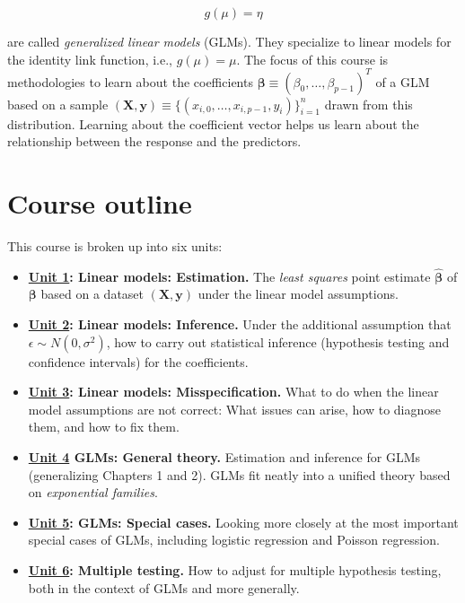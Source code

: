 \documentclass[
  11pt,
  letterpaper,
  oneside]{book}
\providecommand{\tightlist}{%
  \setlength{\itemsep}{0pt}\setlength{\parskip}{0pt}}\usepackage{longtable,booktabs,array}
\theoremstyle{definition}
\theoremstyle{plain}
\theoremstyle{plain}
\theoremstyle{plain}
\theoremstyle{remark}
\begin{document}
\[
g(\mu) = \eta
\]

are called \emph{generalized linear models} (GLMs). They specialize to
linear models for the identity link function, i.e., \(g(\mu) = \mu\).
The focus of this course is methodologies to learn about the
coefficients
\(\boldsymbol{\beta} \equiv (\beta_0, \dots, \beta_{p-1})^T\) of a GLM
based on a sample
\((\boldsymbol{X}, \boldsymbol{y}) \equiv \{(x_{i,0}, \dots, x_{i,p-1}, y_i)\}_{i = 1}^n\)
drawn from this distribution. Learning about the coefficient vector
helps us learn about the relationship between the response and the
predictors.

\hypertarget{course-outline}{%
\section{Course outline}\label{course-outline}}

This course is broken up into six units:

\begin{itemize}
\tightlist
\item
  \textbf{\protect\hyperlink{sec-linear-models-estimation}{Unit 1}:
  Linear models: Estimation.} The \emph{least squares} point estimate
  \(\boldsymbol{\widehat \beta}\) of \(\boldsymbol{\beta}\) based on a
  dataset \((\boldsymbol{X}, \boldsymbol{y})\) under the linear model
  assumptions.
\item
  \textbf{\protect\hyperlink{linear-models-inference}{Unit 2}: Linear
  models: Inference.} Under the additional assumption that
  \(\epsilon \sim N(0,\sigma^2)\), how to carry out statistical
  inference (hypothesis testing and confidence intervals) for the
  coefficients.
\item
  \textbf{\protect\hyperlink{linear-models-misspecification}{Unit 3}:
  Linear models: Misspecification.} What to do when the linear model
  assumptions are not correct: What issues can arise, how to diagnose
  them, and how to fix them.
\item
  \textbf{\protect\hyperlink{ch-glm-theory}{Unit 4} GLMs: General
  theory.} Estimation and inference for GLMs (generalizing Chapters 1
  and 2). GLMs fit neatly into a unified theory based on
  \emph{exponential families}.
\item
  \textbf{\protect\hyperlink{sec-glms-special-cases}{Unit 5}: GLMs:
  Special cases.} Looking more closely at the most important special
  cases of GLMs, including logistic regression and Poisson regression.
\item
  \textbf{\protect\hyperlink{sec-multiple-testing}{Unit 6}: Multiple
  testing.} How to adjust for multiple hypothesis testing, both in the
  context of GLMs and more generally.
\end{itemize}
\end{document}
